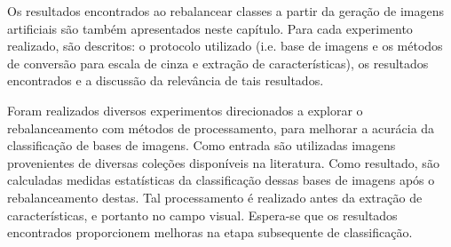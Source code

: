 
%

Os resultados encontrados ao rebalancear classes a partir da geração de imagens artificiais são também apresentados neste capítulo. Para cada experimento realizado, são descritos: o protocolo utilizado (i.e. base de imagens e os métodos de conversão para escala de cinza e extração de características), os resultados encontrados e a discussão da relevância de tais resultados.

Foram realizados diversos experimentos direcionados a explorar o rebalanceamento com métodos de processamento, para melhorar a acurácia da classificação de bases de imagens. Como entrada são utilizadas imagens provenientes de diversas coleções disponíveis na literatura. Como resultado, são calculadas medidas estatísticas da classificação dessas bases de imagens após o rebalanceamento destas. Tal processamento é realizado antes da extração de características, e portanto no campo visual. Espera-se que os resultados encontrados proporcionem melhoras na etapa subsequente de classificação.

